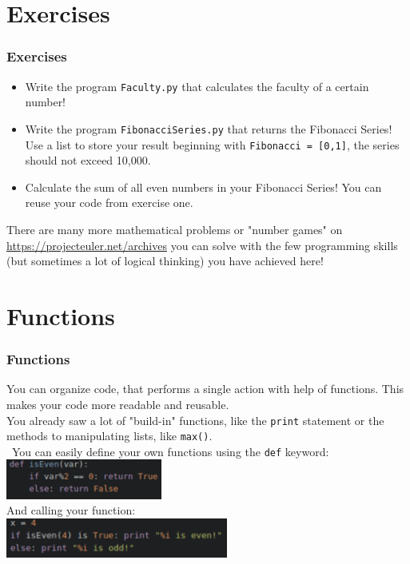 \documentclass{beamer}
\begin{document}
\section{Exercises}

\begin{frame}
\frametitle{Exercises}
	\begin{itemize}
		\item Write the program \texttt{Faculty.py} that calculates the faculty of a certain number!
		\item Write the program \texttt{FibonacciSeries.py} that returns the Fibonacci Series! Use a list to store your result beginning with \texttt{Fibonacci = [0,1]}, the series should not exceed 10,000.
		\item Calculate the sum of all even numbers in your Fibonacci Series! You can reuse your code from exercise one.
	\end{itemize}
	There are many more mathematical problems or "number games" on \url {https://projecteuler.net/archives} you can solve with the few programming skills (but sometimes a lot of logical thinking) you have achieved here!
\end{frame}

\section{Functions}

\begin{frame}
\frametitle{Functions}
	You can organize code, that performs a single action with help of functions. This makes your code more readable and reusable. \\ You already saw a lot of "build-in" functions, like the \texttt{print} statement or the methods to manipulating lists, like \texttt{max()}. \\\ You can easily define your own functions using the \texttt{def} keyword:\\
		\includegraphics[height = 1.3cm]{isEvenFunc.pdf}\\
	And calling your function: \\
		\includegraphics[height = 1.3cm]{FunctionUse.pdf}	 
\end{frame}
\end{document}
